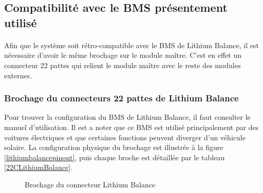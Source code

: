\subsection{Compatibilité avec le BMS présentement utilisé}
	\paragraph*{}	
	Afin que le système soit rétro-compatible avec le BMS de Lithium Balance, il est nécessaire d'avoir le même brochage sur le module maître. C'est en effet un connecteur 22 pattes qui relient le module maître avec le reste des modules externes.

	\subsubsection{Brochage du connecteurs 22 pattes de Lithium Balance}
	
	Pour trouver la configuration du BMS de Lithium Balance, il faut consulter le manuel d'utilisation. Il est a noter que ce BMS est utilisé principalement par des voitures électriques et que certaines fonctions peuvent diverger d'un véhicule solaire. La configuration physique du brochage est illustrée à la figure \ref{lithiumbalancepinout}, puis chaque broche est détaillée par le tableau \ref{22CLithiumBalance}.
	
	\begin{figure}[H]
		\centering
		\caption{Brochage du connecteur Lithium Balance}
		\label{fig:lithiumbalancepinout}
	\end{figure}
	
